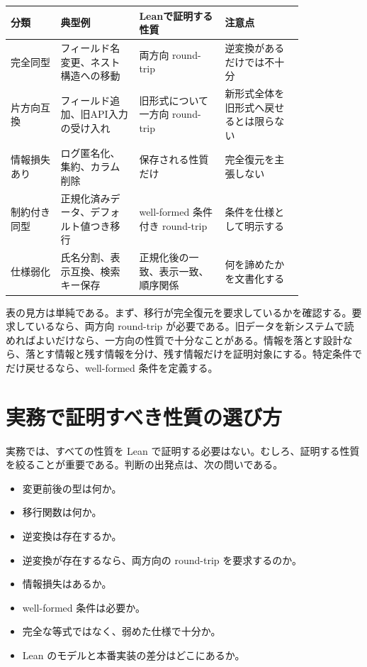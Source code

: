 \small
\begin{longtable}{p{0.14\linewidth}p{0.22\linewidth}p{0.24\linewidth}p{0.22\linewidth}}
\toprule
分類 & 典型例 & Leanで証明する性質 & 注意点 \\
\midrule
完全同型 & フィールド名変更、ネスト構造への移動 & 両方向 round-trip & 逆変換があるだけでは不十分 \\
\midrule
片方向互換 & フィールド追加、旧API入力の受け入れ & 旧形式について一方向 round-trip & 新形式全体を旧形式へ戻せるとは限らない \\
\midrule
情報損失あり & ログ匿名化、集約、カラム削除 & 保存される性質だけ & 完全復元を主張しない \\
\midrule
制約付き同型 & 正規化済みデータ、デフォルト値つき移行 & well-formed 条件付き round-trip & 条件を仕様として明示する \\
\midrule
仕様弱化 & 氏名分割、表示互換、検索キー保存 & 正規化後の一致、表示一致、順序関係 & 何を諦めたかを文書化する \\
\bottomrule
\end{longtable}
\normalsize


表の見方は単純である。まず、移行が完全復元を要求しているかを確認する。要求しているなら、両方向 round-trip が必要である。旧データを新システムで読めればよいだけなら、一方向の性質で十分なことがある。情報を落とす設計なら、落とす情報と残す情報を分け、残す情報だけを証明対象にする。特定条件でだけ戻せるなら、well-formed 条件を定義する。

\section{実務で証明すべき性質の選び方}

実務では、すべての性質を Lean で証明する必要はない。むしろ、証明する性質を絞ることが重要である。判断の出発点は、次の問いである。

\begin{itemize}
\item 変更前後の型は何か。
\item 移行関数は何か。
\item 逆変換は存在するか。
\item 逆変換が存在するなら、両方向の round-trip を要求するのか。
\item 情報損失はあるか。
\item well-formed 条件は必要か。
\item 完全な等式ではなく、弱めた仕様で十分か。
\item Lean のモデルと本番実装の差分はどこにあるか。
\end{itemize}

